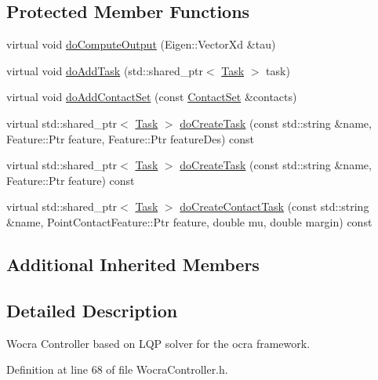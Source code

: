 \subsection*{Protected Member Functions}
\begin{DoxyCompactItemize}
\item 
virtual void \hyperlink{classwocra_1_1WocraController_aaf750c45d062220e3f78ccb1c8a41d07}{do\+Compute\+Output} (Eigen\+::\+Vector\+Xd \&tau)
\item 
virtual void \hyperlink{classwocra_1_1WocraController_aa9a681aa5c0f043638d4d2956c2913c1}{do\+Add\+Task} (std\+::shared\+\_\+ptr$<$ \hyperlink{classocra_1_1Task}{Task} $>$ task)
\item 
virtual void \hyperlink{classwocra_1_1WocraController_a74d8fa3103ca3787add351620c5bcf73}{do\+Add\+Contact\+Set} (const \hyperlink{classocra_1_1ContactSet}{Contact\+Set} \&contacts)
\item 
virtual std\+::shared\+\_\+ptr$<$ \hyperlink{classocra_1_1Task}{Task} $>$ \hyperlink{classwocra_1_1WocraController_a4ce73b9a7b7026427e8abf44f54155af}{do\+Create\+Task} (const std\+::string \&name, Feature\+::\+Ptr feature, Feature\+::\+Ptr feature\+Des) const
\item 
virtual std\+::shared\+\_\+ptr$<$ \hyperlink{classocra_1_1Task}{Task} $>$ \hyperlink{classwocra_1_1WocraController_a1dec71e9c2fb5b2d6fab0bcd230e9c00}{do\+Create\+Task} (const std\+::string \&name, Feature\+::\+Ptr feature) const
\item 
virtual std\+::shared\+\_\+ptr$<$ \hyperlink{classocra_1_1Task}{Task} $>$ \hyperlink{classwocra_1_1WocraController_a60caf0250523856f915785efde7d2368}{do\+Create\+Contact\+Task} (const std\+::string \&name, Point\+Contact\+Feature\+::\+Ptr feature, double mu, double margin) const
\end{DoxyCompactItemize}
\subsection*{Additional Inherited Members}


\subsection{Detailed Description}
Wocra Controller based on L\+QP solver for the ocra framework. 



Definition at line 68 of file Wocra\+Controller.\+h.



